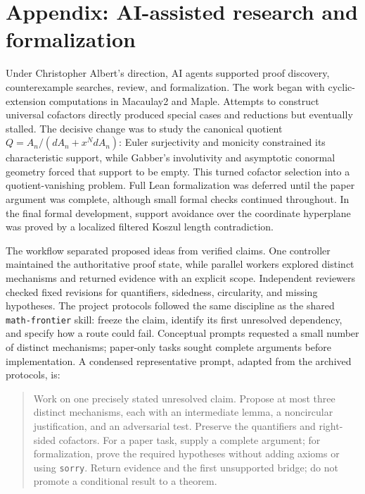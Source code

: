 
\ifdefined\StaffordWorkflowAppendix
\section*{Appendix: AI-assisted research and formalization}

Under Christopher Albert's direction, AI agents supported proof discovery,
counterexample searches, review, and formalization. The work began with
cyclic-extension computations in Macaulay2 and Maple. Attempts to construct
universal cofactors directly produced special cases and reductions but
eventually stalled. The decisive change was to study the canonical quotient
$Q=A_n/(dA_n+x^N dA_n)$: Euler surjectivity and monicity constrained its
characteristic support, while Gabber's involutivity and asymptotic conormal
geometry forced that support to be empty. This turned cofactor selection
into a quotient-vanishing problem. Full Lean formalization was deferred
until the paper argument was complete, although small formal checks
continued throughout. In the final formal development, support avoidance
over the coordinate hyperplane was proved by a localized filtered Koszul
length contradiction.

The workflow separated proposed ideas from verified claims. One controller
maintained the authoritative proof state, while parallel workers explored
distinct mechanisms and returned evidence with an explicit scope.
Independent reviewers checked fixed revisions for quantifiers, sidedness,
circularity, and missing hypotheses. The project protocols followed the
same discipline as the shared \texttt{math-frontier} skill: freeze the
claim, identify its first unresolved dependency, and specify how a route
could fail. Conceptual prompts requested a small number of distinct
mechanisms; paper-only tasks sought complete arguments before implementation.
A condensed representative prompt, adapted from the archived protocols, is:
\begin{quote}\small
Work on one precisely stated unresolved claim. Propose at most three
distinct mechanisms, each with an intermediate lemma, a noncircular
justification, and an adversarial test. Preserve the quantifiers and
right-sided cofactors. For a paper task, supply a complete argument; for
formalization, prove the required hypotheses without adding axioms or
using \texttt{sorry}. Return evidence and the first unsupported bridge; do not
promote a conditional result to a theorem.
\end{quote}

